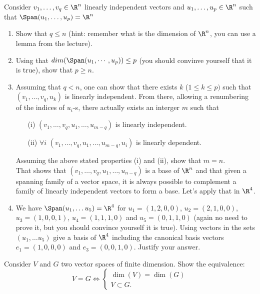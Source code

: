 \documentclass[11pt,nocut]{article}
\begin{document}
\begin{problem}[2 points] 
    Consider $v_1, \dots, v_q \in \R^n$ linearly independent vectors and $u_1, \dots, u_p \in \R^n$ such that $\Span(u_1, \dots, u_p) = \R^n$
    \begin{enumerate}[label=\normalfont(\textbf{\alph*})]
        \item Show that $q \leq n$ (hint: remember what is the dimension of $\R^n$, you can use a lemma from the lecture).
        \item Using that $dim(\Span(u_1, \cdots, u_p))\leq p$ (you should convinve yourself that it is true), show that $p \geq n$.
        \item Assuming that $q<n$, one can show that there exists $k$ ($1 \leq k \leq p)$ such that $(v_1, \dots, v_q, u_k)$ is linearly independent.
        From there, allowing a renumbering of the indices of $u_i$-s, there actually exists an interger $m$ such that 
        \begin{itemize}
            \item[(i)] $(v_1, \dots, v_q, u_1, \dots, u_{m-q})$ is linearly independent. 
            \item[(ii)] $\forall i$ $(v_1, \dots, v_q, u_1, \dots, u_{m-q}, u_i)$ is linearly dependent.
        \end{itemize}
        Assuming the above stated properties (i) and (ii), show that $m=n$. \\That shows that $(v_1, \dots, v_q, u_1, \dots, u_{n-q})$ is a base of $\R^n$ and that given a spanning family of a vector space, it is always possible to complement a family of linearly independent vectors to form a base. Let's apply that in $\R^4$. 
        \item We have $\Span(u_1, \dots u_5)= \R^4$ for $u_1 = (1, 2, 0, 0)$, $u_2 = (2, 1, 0, 0)$, $u_3 = (1, 0, 0, 1)$, $u_4 = (1, 1, 1, 0)$ and $u_5 = (0, 1, 1, 0)$ (again no need to prove it, but you should convince yourself it is true). Using vectors in the sets $(u_1, \dots u_5)$ give a basis of $\R^4$ including the canonical basis vectors $e_1 = (1, 0, 0, 0)$ and $e_3 = (0, 0, 1, 0)$. Justify your answer.
    \end{enumerate}
\end{problem}

\vspace{1mm}

\begin{problem}[$\star$]
Consider $V$ and $G$ two vector spaces of finite dimension. Show the equivalence:
$$
V = G \Longleftrightarrow \left\{\begin{array}{l}
\dim(V) = \dim(G) \\
V \subset G.
\end{array}\right.
$$
\end{problem}

\vspace{1mm}



%
%
\end{document}
